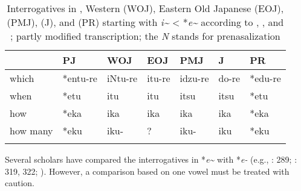 \begin{table}
\caption{Interrogatives in , Western  (WOJ), Eastern Old Japanese (EOJ),  (PMJ),  (J), and  (PR) starting with \textit{i{\textasciitilde}} < *\textit{e{\textasciitilde}} according to \cite[63ff.]{Aston1904}, \cite[297ff.]{Vovin2005}, and \cite[589ff.]{Kupchik2011}; partly modified transcription; the \textit{N} stands for prenasalization}
\label{tab:japa:6}

\begin{tabularx}{\textwidth}{XXXXXXX}
\lsptoprule
& \textbf{PJ} & \textbf{WOJ} & \textbf{EOJ} & \textbf{PMJ} & \textbf{J} & \textbf{PR}\\
\midrule
which & *entu-re & iNtu-re & itu-re & idzu-re & do-re & *edu-re\\
when & *etu & itu & itu & itsu & itsu & *etu\\
how & *eka & ika & ika & ika & ika & *eka\\
how many & *eku & iku- & ? & iku- & iku & *eku\\
\lspbottomrule
\end{tabularx}
\end{table}

\largerpage
Several scholars have compared the interrogatives in *\textit{e{\textasciitilde}} with  *\textit{e-} (e.g., \citealt{FrellesvigWhitman2004}: 289; \citealt{Vovin2005}: 319, 322; ). However, a comparison based on one vowel must be treated with caution.


